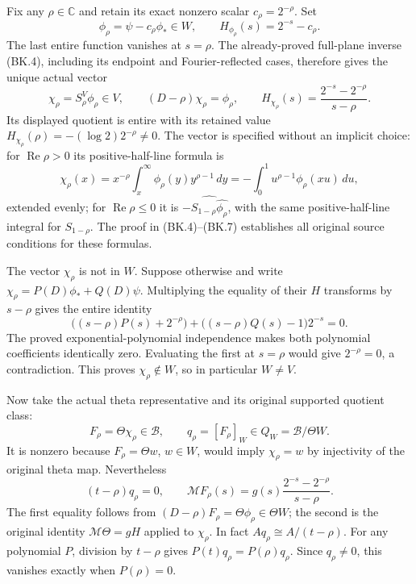 Fix any $\rho\in\mathbb C$ and retain its exact nonzero scalar
$c_\rho=2^{-\rho}$. Set
\[
 \phi_\rho=\psi-c_\rho\phi_*\in W,
 \qquad H_{\phi_\rho}(s)=2^{-s}-c_\rho.
 \tag{PL.4}
\]
The last entire function vanishes at $s=\rho$. The already-proved
full-plane inverse (BK.4), including its endpoint and Fourier-reflected
cases, therefore gives the unique actual vector
\[
 \chi_\rho=S^V_\rho\phi_\rho\in V,
 \qquad (D-\rho)\chi_\rho=\phi_\rho,
 \qquad
 H_{\chi_\rho}(s)=\frac{2^{-s}-2^{-\rho}}{s-\rho}.
 \tag{PL.5}
\]
Its displayed quotient is entire with its retained value
$H_{\chi_\rho}(\rho)=-(\log2)2^{-\rho}\ne0$.
The vector is specified without an implicit choice: for
$\operatorname{Re}\rho>0$ its positive-half-line formula is
\[
 \chi_\rho(x)=x^{-\rho}\int_x^\infty
              \phi_\rho(y)y^{\rho-1}\,dy
          =-\int_0^1u^{\rho-1}\phi_\rho(xu)\,du,
 \tag{PL.6}
\]
extended evenly; for $\operatorname{Re}\rho\le0$ it is
$-\widehat{S_{1-\rho}\widehat{\phi_\rho}}$, with the same
positive-half-line integral for $S_{1-\rho}$. The proof in (BK.4)--(BK.7)
establishes all original source conditions for these formulas.

The vector $\chi_\rho$ is not in $W$. Suppose otherwise and write
$\chi_\rho=P(D)\phi_*+Q(D)\psi$. Multiplying the equality of their
$H$ transforms by $s-\rho$ gives the entire identity
\[
 \bigl((s-\rho)P(s)+2^{-\rho}\bigr)
   +\bigl((s-\rho)Q(s)-1\bigr)2^{-s}=0.
 \tag{PL.7}
\]
The proved exponential-polynomial independence makes both polynomial
coefficients identically zero. Evaluating the first at $s=\rho$
would give $2^{-\rho}=0$, a contradiction. This proves
$\chi_\rho\notin W$, so in particular $W\ne V$.

Now take the actual theta representative and its original supported
quotient class:
\[
 F_\rho=\Theta\chi_\rho\in\mathscr B,
 \qquad q_\rho=[F_\rho]_W\in Q_W=\mathscr B/\Theta W.
 \tag{PL.8}
\]
It is nonzero because $F_\rho=\Theta w$, $w\in W$, would imply
$\chi_\rho=w$ by injectivity of the original theta map. Nevertheless
\[
 (t-\rho)q_\rho=0,
 \qquad
 \mathcal MF_\rho(s)
       =g(s)\frac{2^{-s}-2^{-\rho}}{s-\rho}.
 \tag{PL.9}
\]
The first equality follows from
$(D-\rho)F_\rho=\Theta\phi_\rho\in\Theta W$; the second is the
original identity $\mathcal M\Theta=gH$ applied to $\chi_\rho$.
In fact $Aq_\rho\cong A/(t-\rho)$. For any polynomial $P$,
division by $t-\rho$ gives $P(t)q_\rho=P(\rho)q_\rho$.
Since $q_\rho\ne0$, this vanishes exactly when $P(\rho)=0$.

